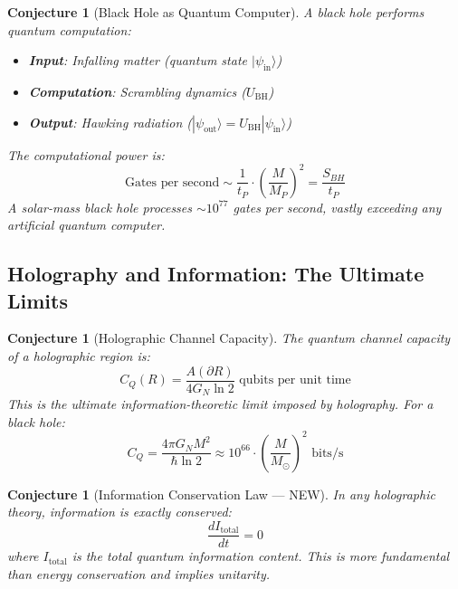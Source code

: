 \documentclass[12pt,a4paper]{article}
\newtheorem{conjecture}[theorem]{Conjecture}
\begin{document}
\begin{conjecture}[Black Hole as Quantum Computer]
A black hole performs quantum computation:
\begin{itemize}
    \item \textbf{Input}: Infalling matter (quantum state $|\psi_{\text{in}}\rangle$)
    \item \textbf{Computation}: Scrambling dynamics ($U_{\text{BH}}$)
    \item \textbf{Output}: Hawking radiation ($|\psi_{\text{out}}\rangle = U_{\text{BH}} |\psi_{\text{in}}\rangle$)
\end{itemize}
The computational power is:
\begin{equation}
\text{Gates per second} \sim \frac{1}{t_P} \cdot \left( \frac{M}{M_P} \right)^2 = \frac{S_{BH}}{t_P}
\end{equation}
A solar-mass black hole processes $\sim 10^{77}$ gates per second, vastly exceeding any artificial quantum computer.
\end{conjecture}

\subsection{Holography and Information: The Ultimate Limits}

\begin{conjecture}[Holographic Channel Capacity]
The quantum channel capacity of a holographic region is:
\begin{equation}
C_Q(R) = \frac{A(\partial R)}{4G_N \ln 2} \text{ qubits per unit time}
\end{equation}
This is the ultimate information-theoretic limit imposed by holography. For a black hole:
\begin{equation}
C_Q = \frac{4\pi G_N M^2}{\hbar \ln 2} \approx 10^{66} \cdot \left( \frac{M}{M_\odot} \right)^2 \text{ bits/s}
\end{equation}
\end{conjecture}

\begin{conjecture}[Information Conservation Law --- NEW]
In any holographic theory, information is exactly conserved:
\begin{equation}
\frac{d I_{\text{total}}}{dt} = 0
\end{equation}
where $I_{\text{total}}$ is the total quantum information content. This is more fundamental than energy conservation and implies unitarity.
\end{conjecture}
\end{document}
